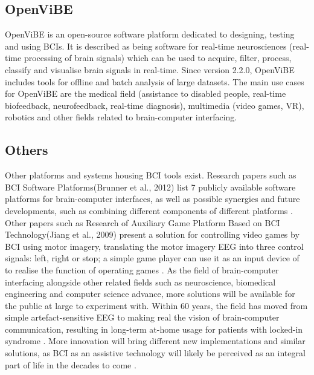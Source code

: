 \subsection{OpenViBE}
OpenViBE is an open-source software platform dedicated to designing, testing and using BCIs. It is described as being software for real-time neurosciences (real-time processing of brain signals) which can be used to acquire, filter, process, classify and visualise brain signals in real-time. Since version 2.2.0, OpenViBE includes tools for offline and batch analysis of large datasets. The main use cases for OpenViBE are the medical field (assistance to disabled people, real-time biofeedback, neurofeedback, real-time diagnosis), multimedia (video games, VR), robotics and other fields related to brain-computer interfacing.

\subsection{Others}
Other platforms and systems housing BCI tools exist. Research papers such as BCI Software Platforms(Brunner et al., 2012) list 7 publicly available software platforms for brain-computer interfaces, as well as possible synergies and future developments, such as combining different components of different platforms \cite{Brunner_2012}. Other papers such as Research of Auxiliary Game Platform Based on BCI Technology(Jiang et al., 2009) present a solution for controlling video games by BCI using motor imagery, translating the motor imagery EEG into three control signals: left, right or stop; a simple game player can use it as an input device of to realise the function of operating games \cite{Jiang_2009}.
\vspace{\baselineskip}\newline
As the field of brain-computer interfacing alongside other related fields such as neuroscience, biomedical engineering and computer science advance, more solutions will be available for the public at large to experiment with. Within 60 years, the field has moved from simple artefact-sensitive EEG to making real the vision of brain-computer communication, resulting in long-term at-home usage for patients with locked-in syndrome \cite{K_bler_2019}. More innovation will bring different new implementations and similar solutions, as BCI as an assistive technology will likely be perceived as an integral part of life in the decades to come \cite{K_bler_2019}.

\newpage

